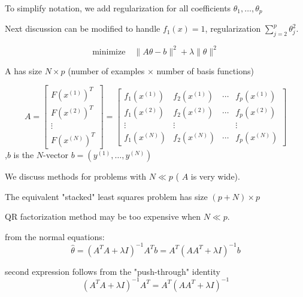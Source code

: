 To simplify notation, we add regularization for all coefficients $\theta_{1}, \ldots, \theta_{p}$

Next discussion can be modified to handle $f_{1}(x)=1$, regularization $\sum_{j=2}^{p} \theta_{j}^{2}$.

\begin{problem}
    \begin{equation}\text{minimize} \quad\|A \theta-b\|^{2}+\lambda\|\theta\|^{2}\end{equation}
\end{problem}

A has size $N \times p$ (number of examples $\times$ number of basis functions)

\begin{equation}
A=\left[\begin{array}{c}
F\left(x^{(1)}\right)^{T} \\
F\left(x^{(2)}\right)^{T} \\
\vdots \\
F\left(x^{(N)}\right)^{T}
\end{array}\right]=\left[\begin{array}{cccc}
f_{1}\left(x^{(1)}\right) & f_{2}\left(x^{(1)}\right) & \cdots & f_{p}\left(x^{(1)}\right) \\
f_{1}\left(x^{(2)}\right) & f_{2}\left(x^{(2)}\right) & \cdots & f_{p}\left(x^{(2)}\right) \\
\vdots & \vdots & & \vdots \\
f_{1}\left(x^{(N)}\right) & f_{2}\left(x^{(N)}\right) & \cdots & f_{p}\left(x^{(N)}\right)
\end{array}\right]
\end{equation}
,$b$ is the $N$-vector $b=\left(y^{(1)}, \ldots, y^{(N)}\right)$

We discuss methods for problems with $N \ll p$ ( $A$ is very wide).

\begin{theorem}
    The equivalent "stacked" least squares problem has size $(p+N) \times p$
\end{theorem}

\begin{remark}
    QR factorization method may be too expensive when $N \ll p$.
\end{remark}

\begin{theorem}
    from the normal equations:
\begin{equation}
\hat{\theta}=\left(A^{T} A+\lambda I\right)^{-1} A^{T} b=A^{T}\left(A A^{T}+\lambda I\right)^{-1} b
\end{equation}

second expression follows from the "push-through" identity
\begin{equation}
\left(A^{T} A+\lambda I\right)^{-1} A^{T}=A^{T}\left(A A^{T}+\lambda I\right)^{-1}
\end{equation}
\end{theorem}


